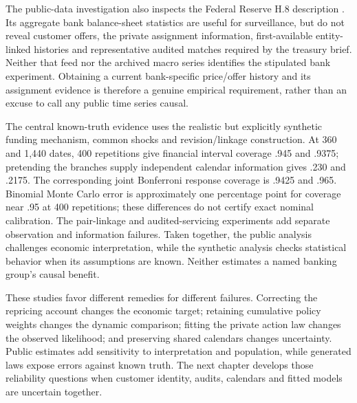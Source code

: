 The public-data investigation also inspects the Federal Reserve H.8
description \citep{fed_h8_dynamic}. Its aggregate bank balance-sheet
statistics are useful for surveillance, but do not reveal customer offers,
the private assignment information, first-available entity-linked histories
and representative audited matches required by the treasury brief. Neither
that feed nor the archived macro series identifies the stipulated bank
experiment. Obtaining a current bank-specific price/offer history and its
assignment evidence is therefore a genuine empirical requirement, rather
than an excuse to call any public time series causal.

The central known-truth evidence uses the realistic but explicitly synthetic
funding mechanism, common shocks and revision/linkage construction. At 360
and 1,440 dates, 400 repetitions give financial interval coverage .945 and
.9375; pretending the branches supply independent calendar information
gives .230 and .2175. The corresponding joint Bonferroni response coverage
is .9425 and .965. Binomial Monte Carlo error is approximately one percentage
point for coverage near .95 at 400 repetitions; these differences do not
certify exact nominal calibration. The pair-linkage and audited-servicing
experiments add separate observation and information failures. Taken
together, the public analysis challenges economic interpretation, while
the synthetic analysis checks statistical behavior when its assumptions
are known. Neither estimates a named banking group's causal benefit.

These studies favor different remedies for different failures. Correcting the repricing account changes the economic target; retaining cumulative policy weights changes the dynamic comparison; fitting the private action law changes the observed likelihood; and preserving shared calendars changes uncertainty. Public estimates add sensitivity to interpretation and population, while generated laws expose errors against known truth. The next chapter develops those reliability questions when customer identity, audits, calendars and fitted models are uncertain together.

